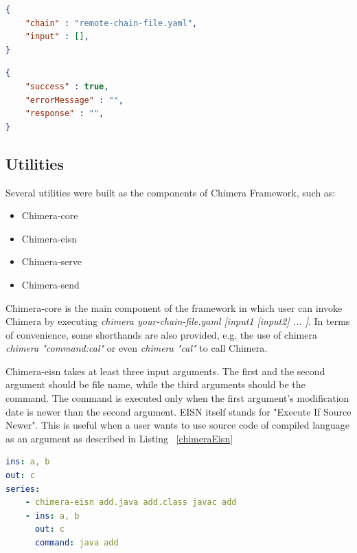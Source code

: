 \documentclass[conference]{IEEEtran}
\begin{document}
\begin{lstlisting}[caption=JSON Request, label=jsonRequest, language=json, basicstyle=\small, breaklines=true] 
{
    "chain" : "remote-chain-file.yaml",
    "input" : [],
}
\end{lstlisting}

\begin{lstlisting}[caption=JSON Response, label=jsonResponse, language=json, basicstyle=\small, breaklines=true]
{
    "success" : true,
    "errorMessage" : "",
    "response" : "",
}
\end{lstlisting}


\subsection{Utilities}

Several utilities were built as the components of Chimera Framework, such as:

\begin{itemize}
    \item Chimera-core
    \item Chimera-eisn
    \item Chimera-serve
    \item Chimera-send
\end{itemize}

Chimera-core is the main component of the framework in which user can invoke Chimera by
executing {\it chimera your-chain-file.yaml [input1 [input2] ... ]}. In terms of convenience,
some shorthands are also provided, e.g. the use of chimera 
{\it chimera "command:cal"} or even {\it chimera "cal"} to call Chimera.

Chimera-eisn takes at least three input arguments. The first and the second argument should
be file name, while the third arguments should be the command. The command is 
executed only when the first argument's modification date is newer than the second 
argument. EISN itself stands for "Execute If Source Newer". This is useful when a user
wants to use source code of compiled language as an argument as described in Listing ~\ref{chimeraEisn}

\begin{lstlisting}[caption=Chimera-eisn usage example, label=chimeraEisn, language=yaml, basicstyle=\small, breaklines=true]
ins: a, b
out: c
series:
    - chimera-eisn add.java add.class javac add
    - ins: a, b
      out: c
      command: java add
\end{lstlisting}
\end{document}
